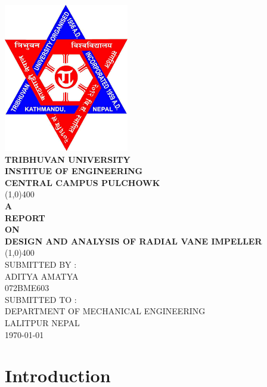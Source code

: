 \documentclass[11pt]{article}
\begin{document}
\begin{titlepage}
\begin{center}
\includegraphics[scale=.5]{TU.png}\\
\centering
\vspace*{.5cm}
  \Large\textbf{TRIBHUVAN UNIVERSITY} \\
  \Large\textbf{INSTITUE OF ENGINEERING} \\
    \Large\textbf{CENTRAL CAMPUS PULCHOWK} \\
  \vfill
  \line(1,0){400}\\
 \Large{\textbf{A \\REPORT\\ ON\\ DESIGN AND ANALYSIS OF RADIAL VANE IMPELLER}}\\[0.1cm]

 \line(1,0){400}\\
 \vfill
 SUBMITTED BY :\\
  ADITYA AMATYA\\
 072BME603\\
 \vfill
 SUBMITTED TO :\\
 DEPARTMENT OF MECHANICAL ENGINEERING\\
 LALITPUR NEPAL\\
 \vfill
 \today
\end{center}
\large
\end{titlepage}

\tableofcontents
\thispagestyle{empty}
\clearpage
\listoffigures
\thispagestyle{empty}
\clearpage

\setcounter{page}{1}

 \section{Introduction}
\end{document}
